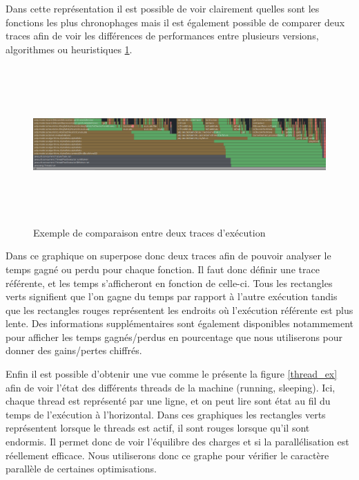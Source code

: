 \documentclass{article}
\begin{document}
Dans cette représentation il est possible de voir clairement quelles sont les fonctions les plus chronophages mais il est également possible 
de comparer deux traces afin de voir les différences de performances entre plusieurs versions, algorithmes ou heuristiques \ref{trace_ex2}.

\begin{figure}[h]
    \centering
    \includegraphics[width=\textwidth,height=6.0cm,keepaspectratio]{trace_ex2.png}
    \caption{Exemple de comparaison entre deux traces d'exécution}
    \label{trace_ex2}
\end{figure}

Dans ce graphique on superpose donc deux traces afin de pouvoir analyser le temps gagné ou perdu pour chaque fonction. Il faut donc définir une trace référente, et les temps
s'afficheront en fonction de celle-ci. Tous les rectangles verts signifient que l'on gagne du temps par rapport à l'autre exécution tandis que les rectangles rouges représentent
les endroits où l'exécution référente est plus lente. Des informations supplémentaires sont également disponibles notammement pour afficher les temps gagnés/perdus en pourcentage
que nous utiliserons pour donner des gains/pertes chiffrés.

Enfin il est possible d'obtenir une vue comme le présente la figure \ref{thread_ex} afin de voir l'état des différents threads de la machine (running, sleeping). Ici, chaque thread est représenté
par une ligne, et on peut lire sont état au fil du temps de l'exécution à l'horizontal. Dans ces graphiques les rectangles verts
représentent lorsque le threads est actif, il sont rouges lorsque qu'il sont endormis. Il permet donc de voir l'équilibre des charges et si la parallélisation est réellement efficace.
Nous utiliserons donc ce graphe pour vérifier le caractère parallèle de certaines optimisations.
\end{document}
